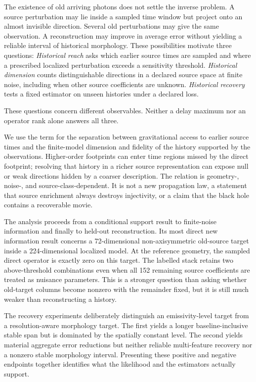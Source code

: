 The existence of old arriving photons does not settle the inverse problem. A source perturbation may lie inside a sampled time window but project onto an almost invisible direction. Several old perturbations may give the same observation. A reconstruction may improve in average error without yielding a reliable interval of historical morphology. These possibilities motivate three questions:
\emph{Historical reach} asks which earlier source times are sampled and where a prescribed localized perturbation exceeds a sensitivity threshold. \emph{Historical dimension} counts distinguishable directions in a declared source space at finite noise, including when other source coefficients are unknown. \emph{Historical recovery} tests a fixed estimator on unseen histories under a declared loss.

These questions concern different observables. Neither a delay maximum nor an operator rank alone answers all three.

\begin{definition}
We use the term for the separation between gravitational access to earlier source times and the finite-model dimension and fidelity of the history supported by the observations. Higher-order footprints can enter time regions missed by the direct footprint; resolving that history in a richer source representation can expose null or weak directions hidden by a coarser description. The relation is geometry-, noise-, and source-class-dependent. It is not a new propagation law, a statement that source enrichment always destroys injectivity, or a claim that the black hole contains a recoverable movie.
\end{definition}

The analysis proceeds from a conditional support result to finite-noise information and finally to held-out reconstruction. Its most direct new information result concerns a 72-dimensional non-axisymmetric old-source target inside a 224-dimensional localized model. At the reference geometry, the sampled direct operator is exactly zero on this target. The labelled stack retains two above-threshold combinations even when all 152 remaining source coefficients are treated as nuisance parameters. This is a stronger question than asking whether old-target columns become nonzero with the remainder fixed, but it is still much weaker than reconstructing a history.

The recovery experiments deliberately distinguish an emissivity-level target from a resolution-aware morphology target. The first yields a longer baseline-inclusive stable span but is dominated by the spatially constant level. The second yields material aggregate error reductions but neither reliable multi-feature recovery nor a nonzero stable morphology interval. Presenting these positive and negative endpoints together identifies what the likelihood and the estimators actually support.

